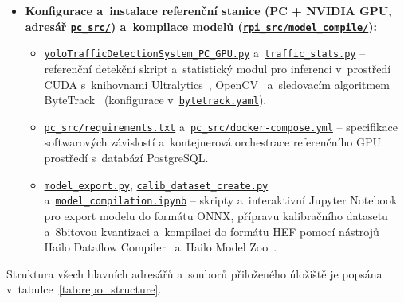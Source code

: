 \begin{itemize}
    \item \textbf{Konfigurace a~instalace referenční stanice (PC + NVIDIA GPU, adresář \href{https://github.com/imang212/Bachelor_Thesis/tree/main/pc_src}{\texttt{pc\_src/}}) a~kompilace modelů (\href{https://github.com/imang212/Bachelor_Thesis/tree/main/rpi_src/model_compile}{\texttt{rpi\_src/model\_compile/}}):}
    \begin{itemize}
        \item \href{https://github.com/imang212/Bachelor_Thesis/blob/main/pc_src/yoloTrafficDetectionSystem_PC_GPU.py}{\texttt{yoloTrafficDetectionSystem\_PC\_GPU.py}} a~\href{https://github.com/imang212/Bachelor_Thesis/blob/main/pc_src/traffic_stats.py}{\texttt{traffic\_stats.py}} – referenční detekční skript a~statistický modul pro inferenci v~prostředí CUDA s~knihovnami Ultralytics~\cite{ultralytics_yolov8_docs}, OpenCV~\cite{bradski_opencv_2000} a~sledovacím algoritmem ByteTrack~\cite{zhang_bytetrack_2022} (konfigurace v~\href{https://github.com/imang212/Bachelor_Thesis/blob/main/pc_src/bytetrack.yaml}{\texttt{bytetrack.yaml}}).
        \item \href{https://github.com/imang212/Bachelor_Thesis/blob/main/pc_src/requirements.txt}{\texttt{pc\_src/requirements.txt}} a~\href{https://github.com/imang212/Bachelor_Thesis/blob/main/pc_src/docker-compose.yml}{\texttt{pc\_src/docker-compose.yml}} – specifikace softwarových závislostí a~kontejnerová orchestrace referenčního GPU prostředí s~databází PostgreSQL.
        \item \href{https://github.com/imang212/Bachelor_Thesis/blob/main/rpi_src/model_compile/model_export.py}{\texttt{model\_export.py}}, \href{https://github.com/imang212/Bachelor_Thesis/blob/main/rpi_src/model_compile/calib_dataset_create.py}{\texttt{calib\_dataset\_create.py}} a~\href{https://github.com/imang212/Bachelor_Thesis/blob/main/rpi_src/model_compile/model_compilation.ipynb}{\texttt{model\_compilation.ipynb}} – skripty a~interaktivní Jupyter Notebook pro export modelu do formátu \acs{ONNX}, přípravu kalibračního datasetu a~8bitovou kvantizaci a~kompilaci do formátu \acs{HEF} pomocí nástrojů Hailo Dataflow Compiler~\cite{hailo_dfc_docs} a~Hailo Model Zoo~\cite{hailo_model_zoo}.
    \end{itemize}
\end{itemize}

Struktura všech hlavních adresářů a~souborů přiloženého úložiště je popsána v~tabulce~\ref{tab:repo_structure}.

